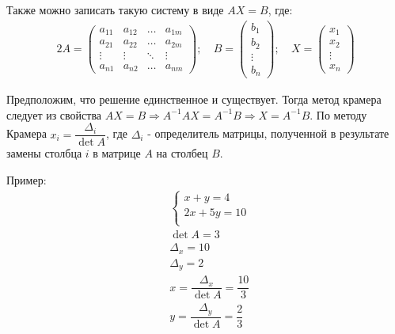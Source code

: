 \documentclass[12pt]{article}
\begin{document}
\begin{sloppypar}
    Также можно записать такую систему в виде $AX = B$, где:
    \begin{alignat*}{2}
        A = \begin{pmatrix}
                a_{11} & a_{12} & \dots  & a_{1m} \\
                a_{21} & a_{22} & \dots  & a_{2m} \\
                \vdots & \vdots & \ddots & \vdots \\
                a_{n1} & a_{n2} & \dots  & a_{nm}
            \end{pmatrix};\  &
        B = \begin{pmatrix}
                b_1    \\
                b_2    \\
                \vdots \\
                b_n
            \end{pmatrix};\                   &
        X = \begin{pmatrix}
                x_1    \\
                x_2    \\
                \vdots \\
                x_n
            \end{pmatrix}
    \end{alignat*}

    Предположим, что решение единственное и существует. Тогда метод крамера следует из свойства $AX = B \Rightarrow A^{-1}AX = A^{-1}B \Rightarrow X = A^{-1}B$. По методу Крамера $x_i = \dfrac{\Delta_i}{\det A}$, где $\Delta_i$ - определитель матрицы, полученной в результате замены столбца $i$ в матрице $A$ на столбец $B$.

    Пример:
    \begin{align*}
         & \begin{cases}
               x + y = 4    \\
               2x + 5y = 10 \\
           \end{cases}                                 \\
         & \det A = 3                                   \\
         & \Delta_x = 10                                \\
         & \Delta_y = 2                                 \\
         & x = \dfrac{\Delta_x}{\det A} = \dfrac{10}{3} \\
         & y = \dfrac{\Delta_y}{\det A} = \dfrac{2}{3}  \\
    \end{align*}


\end{sloppypar}
\end{document}
